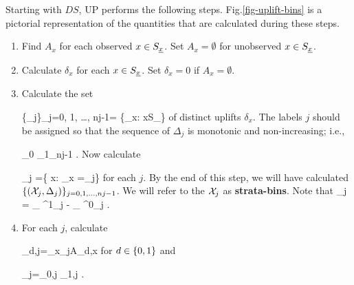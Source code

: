Starting with $DS$,
UP performs the following steps.
Fig.\ref{fig-uplift-bins}
is a pictorial representation
of the quantities
that are calculated
during these steps.

\begin{enumerate}
\item Find $A_x$ 
for each observed $x\in S_{\underline{x}}$.
Set $A_x=\emptyset$ for unobserved $x\in S_{\underline{x}}$.
 
\item Calculate $\delta_x$
for each $x\in S_{\underline{x}}$.
Set $\delta_x=0$ if $A_x=\emptyset$.

\item Calculate
the set 

\beq\{\Delta_j\}_{j=0, 1, \ldots, nj-1}=
\{\delta_x: x\in S_\rvx\}
\eeq
of distinct uplifts $\delta_x$.
The labels 
$j$ should be assigned
so that the sequence of
$\Delta_j$
is monotonic and non-increasing; i.e.,

\beq
\Delta_0 \geq \Delta_{1}\geq\cdots \geq \Delta_{nj-1}
\;.
\eeq
Now calculate 

\beq
\calx_j =\{ x: \delta_x =\Delta_j\}
\eeq
 for each $j$.
By the end of this step,
we will have calculated 
$\{({\cal X}_j, \Delta_j)\}_{j=0,1, \ldots, nj-1}$.
We will refer to the ${\cal X}_j$
as {\bf strata-bins}. Note that
\beq
\Delta_j = 
_
{\displaystyle \Pi^1_j}
- 
_
{\displaystyle \Pi^0_j}
\;.
\eeq
\item
For each $j$,
calculate 

\beq
\Sigma_{d,j}=\cup_{x\in \calx_j}A_{d,x}
\eeq
for $d\in\{0,1\}$
and 

\beq
\Sigma_{j}=\Sigma_{0,j}
\cup \Sigma_{1,j}
\;.
\eeq
\end{enumerate}


